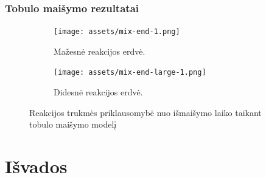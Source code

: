 \documentclass{beamer}
\begin{document}
\begin{frame}
    \frametitle{Tobulo maišymo rezultatai}

    \begin{figure}
      \centering
      \begin{subfigure}[t]{0.45\linewidth}
        \texttt{[image: assets/mix-end-1.png]}
        \caption{Mažesnė reakcijos erdvė. \label{fig:perfect-small}}
      \end{subfigure}
      \hfill
      \begin{subfigure}[t]{0.45\linewidth}
        \texttt{[image: assets/mix-end-large-1.png]}
        \caption{Didesnė reakcijos erdvė. \label{fig:perfect-large}}
      \end{subfigure}
      \caption{Reakcijos trukmės priklausomybė nuo išmaišymo laiko taikant tobulo maišymo modelį}
    \end{figure}
\end{frame}



\section{Išvados}
\end{document}
